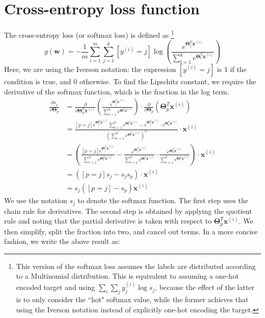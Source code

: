 \documentclass[sigconf,authordraft]{acmart}
\begin{document}
\section{Cross-entropy loss function} 
The cross-entropy loss (or softmax loss) is defined as\cite{ng2000cs229} \footnote{This version of the softmax loss assumes the labels are distributed according to a Multinomial distribution. This is equivalent to assuming a one-hot encoded target and using $\sum_i \sum_j y^{(i)}_j \log s_j$, because the effect of the latter is to only consider the ``hot" softmax value, while the former achieves that using the Iverson notation instead of explicitly one-hot encoding the target.}
\[
    g(\textbf{w}) = -\frac{1}{m} \sum\limits_{i=1}^m \sum\limits_{j=1}^k [y^{(i)}=j] \log \left( \frac{e^{\boldsymbol\Theta_j^T \textbf{x}^{(i)}}}{\sum_{l=1}^k e^{\boldsymbol\Theta_l^T \textbf{x}^{(i)}}} \right)
\]
Here, we are using the Iverson notation: the expression $[y^{(i)}=j]$ is 1 if the condition is true, and 0 otherwise. To find the Lipschitz constant, we require the derivative of the softmax function, which is the fraction in the log term.
\[
    \begin{aligned} \frac{\partial s_j}{\partial \boldsymbol\Theta_p} &= \frac{\partial}{\partial \boldsymbol\Theta^T_p \textbf{x}^{(i)}} \left( \frac{e^{\boldsymbol\Theta^T_j \textbf{x}^{(i)}}}{\sum_{l=1}^k e^{\boldsymbol\Theta^T_l \textbf{x}^{(i)}}} \right) \cdot \frac{\partial}{\partial \boldsymbol\Theta_p} \left( \boldsymbol\Theta^T_p \textbf{x}^{(i)} \right)  \\ &= \frac{[p=j] e^{\boldsymbol\Theta^T_j \textbf{x}^{(i)}}\sum_{l=1}^k e^{\boldsymbol\Theta^T_l \textbf{x}^{(i)}} - e^{\boldsymbol\Theta^T_j \textbf{x}^{(i)}} \cdot e^{\boldsymbol\Theta^T_p \textbf{x}^{(i)}} }{\left( \sum_{l=1}^k e^{\boldsymbol\Theta^T_l \textbf{x}^{(i)}} \right)^2} \cdot \textbf{x}^{(i)} \\ &= \left( \frac{[p=j] e^{\boldsymbol\Theta^T_j \textbf{x}^{(i)}}}{\sum_{l=1}^k e^{\boldsymbol\Theta^T_l \textbf{x}^{(i)}}} - \frac{e^{\boldsymbol\Theta^T_j \textbf{x}^{(i)}}}{\sum_{l=1}^k e^{\boldsymbol\Theta^T_l \textbf{x}^{(i)}}} \cdot \frac{e^{\boldsymbol\Theta^T_p \textbf{x}^{(i)}}}{\sum_{l=1}^k e^{\boldsymbol\Theta^T_l \textbf{x}^{(i)}}} \right) \cdot \textbf{x}^{(i)} \\ &= \left([p=j] s_j - s_j s_p \right) \cdot \textbf{x}^{(i)} \\ &= s_j([p=j]-s_p)\textbf{x}^{(i)} \end{aligned}
\]
We use the notation $s_j$ to denote the softmax function. The first step uses the chain rule for derivatives. The second step is obtained by applying the quotient rule and noting that the partial derivative is taken with respect to $\boldsymbol\Theta_p^T \textbf{x}^{(i)}$. We then simplify, split the fraction into two, and cancel out terms. In a more concise fashion, we write the above result as:
\end{document}
